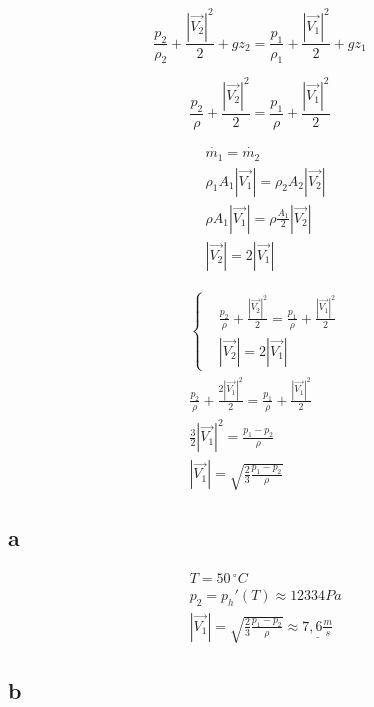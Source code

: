 \documentclass[12pt,a4paper,finnish]{article}
\begin{document}
\begin{framed}
\begin{equation}
   \frac{p_2}{\rho_2} + \frac{|\vec{V_2}|^2}{2} + gz_2 = \frac{p_1}{\rho_1} + \frac{|\vec{V_1}|^2}{2} + gz_1
\end{equation}
\end{framed}

\begin{equation}
   \frac{p_2}{\rho} + \frac{|\vec{V_2}|^2}{2} = \frac{p_1}{\rho} + \frac{|\vec{V_1}|^2}{2}
\end{equation}

\begin{align}
  &\dot{m_1} = \dot{m_2}\\
  &\rho_1 A_1|\vec{V_1}| = \rho_2 A_2|\vec{V_2}|\\
  &\rho A_1|\vec{V_1}| = \rho \frac{A_1}{2}|\vec{V_2}|\\
  & |\vec{V_2}| = 2|\vec{V_1}|
\end{align}

\begin{align}
  &\left\{
  \begin{aligned}
   &\frac{p_2}{\rho} + \frac{|\vec{V_2}|^2}{2} = \frac{p_1}{\rho} + \frac{|\vec{V_1}|^2}{2}\\
  & |\vec{V_2}| = 2|\vec{V_1}|
    \end{aligned}\right.\\
   &\frac{p_2}{\rho} + \frac{2|\vec{V_1}|^2}{2} = \frac{p_1}{\rho} + \frac{|\vec{V_1}|^2}{2}\\
   &\frac{3}{2}|\vec{V_1}|^2 = \frac{p_1 - p_2}{\rho}\\
   &|\vec{V_1}| = \sqrt{\frac{2}{3}\frac{p_1 - p_2}{\rho}}
\end{align}

\subsection{a}

\begin{align}
 &T = 50\,^{\circ}C\\
 &p_2 = p_h'(T) \approx 12334 Pa\\
 &|\vec{V_1}| = \sqrt{\frac{2}{3}\frac{p_1 - p_2}{\rho}} \approx \underline{7,6\frac{m}{s}}
\end{align}

\subsection{b}
\end{document}
